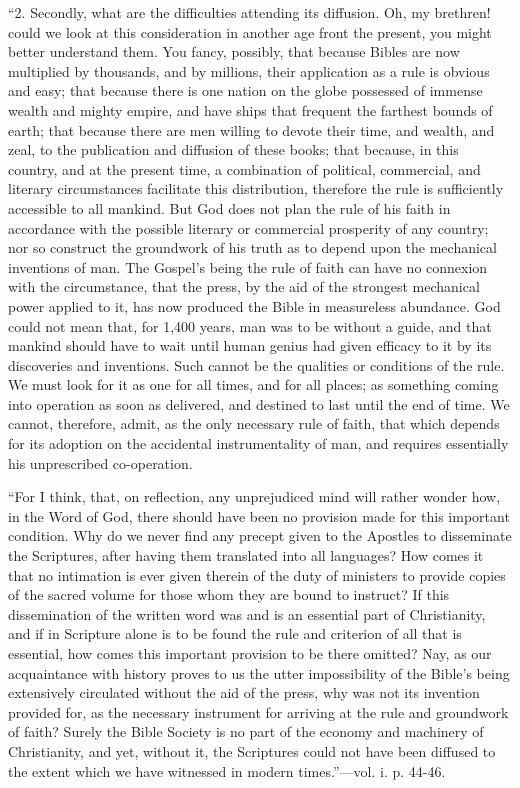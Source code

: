 ``2.
Secondly, what are the difficulties attending its diffusion. Oh, my
brethren! could we look at this consideration in another age front the
present, you might better understand them. You fancy, possibly, that
because Bibles are now multiplied by thousands, and by millions, their
application as a rule is obvious and easy; that because there is one
nation on the globe possessed of immense wealth and mighty empire, and
have ships that frequent the farthest bounds of earth; that because
there are men willing to devote their time, and wealth, and zeal, to the
publication and diffusion of these books; that because, in this country,
and at the present time, a combination of political, commercial, and
literary circumstances facilitate this distribution, therefore the rule
is sufficiently accessible to all mankind. But God does not plan the
rule of his faith in accordance with the possible literary or commercial
prosperity of any country; nor so construct the groundwork of his truth
as to depend upon the mechanical inventions of man. The Gospel's being
the rule of faith can have no connexion with
the circumstance, that the press, by the aid of the strongest mechanical
power applied to it, has now produced the Bible in measureless
abundance. God could not mean that, for 1,400 years, man was to be
without a guide, and that mankind should have to wait until human genius
had given efficacy to it by its discoveries and inventions. Such cannot
be the qualities or conditions of the rule. We must look for it as one
for all times, and for all places; as something coming into operation as
soon as delivered, and destined to last until the end of time. We
cannot, therefore, admit, as the only necessary rule of faith, that
which depends for its adoption on the accidental instrumentality of man,
and requires essentially his unprescribed co-operation.

``For
I think, that, on reflection, any unprejudiced mind will rather wonder
how, in the Word of God, there should have been no provision made for
this important condition. Why do we never find any precept given to the
Apostles to disseminate the Scriptures, after having them translated
into all languages? How comes it that no intimation is ever given
therein of the duty of ministers to provide copies of the sacred volume
for those whom they are bound to instruct? If this dissemination of the
written word was and is an essential part of Christianity, and if in
Scripture alone is to be found the rule and criterion of all that is
essential, how comes this important provision to be there omitted? Nay,
as our acquaintance with history proves to us the utter impossibility of
the Bible's being extensively circulated without the aid of the press,
why was not its invention provided for, as the necessary instrument for
arriving at the rule and groundwork of faith? Surely the Bible Society
is no part of the economy and machinery of Christianity, and yet,
without it, the Scriptures could not have been diffused to the extent
which we have witnessed in modern times.''—vol. i. p. 44-46.

